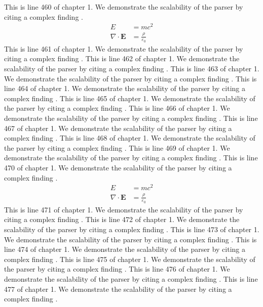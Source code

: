 This is line 460 of chapter 1. We demonstrate the scalability of the parser by citing a complex finding \cite{ref1_460}.
\begin{align*}
  E &= mc^2 \\
  \nabla \cdot \mathbf{E} &= \frac{\rho}{\varepsilon_0}
\end{align*}
This is line 461 of chapter 1. We demonstrate the scalability of the parser by citing a complex finding \cite{ref1_461}.
This is line 462 of chapter 1. We demonstrate the scalability of the parser by citing a complex finding \cite{ref1_462}.
This is line 463 of chapter 1. We demonstrate the scalability of the parser by citing a complex finding \cite{ref1_463}.
This is line 464 of chapter 1. We demonstrate the scalability of the parser by citing a complex finding \cite{ref1_464}.
This is line 465 of chapter 1. We demonstrate the scalability of the parser by citing a complex finding \cite{ref1_465}.
This is line 466 of chapter 1. We demonstrate the scalability of the parser by citing a complex finding \cite{ref1_466}.
This is line 467 of chapter 1. We demonstrate the scalability of the parser by citing a complex finding \cite{ref1_467}.
This is line 468 of chapter 1. We demonstrate the scalability of the parser by citing a complex finding \cite{ref1_468}.
This is line 469 of chapter 1. We demonstrate the scalability of the parser by citing a complex finding \cite{ref1_469}.
This is line 470 of chapter 1. We demonstrate the scalability of the parser by citing a complex finding \cite{ref1_470}.
\begin{align*}
  E &= mc^2 \\
  \nabla \cdot \mathbf{E} &= \frac{\rho}{\varepsilon_0}
\end{align*}
This is line 471 of chapter 1. We demonstrate the scalability of the parser by citing a complex finding \cite{ref1_471}.
This is line 472 of chapter 1. We demonstrate the scalability of the parser by citing a complex finding \cite{ref1_472}.
This is line 473 of chapter 1. We demonstrate the scalability of the parser by citing a complex finding \cite{ref1_473}.
This is line 474 of chapter 1. We demonstrate the scalability of the parser by citing a complex finding \cite{ref1_474}.
This is line 475 of chapter 1. We demonstrate the scalability of the parser by citing a complex finding \cite{ref1_475}.
This is line 476 of chapter 1. We demonstrate the scalability of the parser by citing a complex finding \cite{ref1_476}.
This is line 477 of chapter 1. We demonstrate the scalability of the parser by citing a complex finding \cite{ref1_477}.
